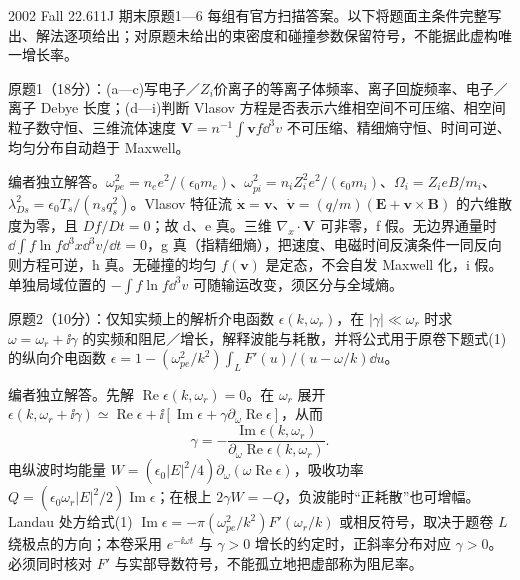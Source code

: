 2002 Fall 22.611J 期末原题1—6 每组有官方扫描答案。以下将题面主条件完整写出、解法逐项给出；对原题未给出的束密度和碰撞参数保留符号，不能据此虚构唯一增长率。
\begin{exercise}\label{ex:hist02-final-1}
原题1（18分）：(a—c)写电子／$Z_i$价离子的等离子体频率、离子回旋频率、电子／离子 Debye 长度；(d—i)判断 Vlasov 方程是否表示六维相空间不可压缩、相空间粒子数守恒、三维流体速度 $\mathbf V=n^{-1}\int\mathbf vf\dd^3v$ 不可压缩、精细熵守恒、时间可逆、均匀分布自动趋于 Maxwell。
\end{exercise}
\begin{solution}
编者独立解答。$\omega_{pe}^2=n_ee^2/(\epsilon_0m_e)$、$\omega_{pi}^2=n_iZ_i^2e^2/(\epsilon_0m_i)$、$\Omega_i=Z_ieB/m_i$、$\lambda_{Ds}^2=\epsilon_0T_s/(n_sq_s^2)$。Vlasov 特征流 $\dot{\mathbf x}=\mathbf v$、$\dot{\mathbf v}=(q/m)(\mathbf E+\mathbf v\times\mathbf B)$ 的六维散度为零，且 $Df/Dt=0$；故 d、e 真。三维 $\nabla_x\cdot\mathbf V$ 可非零，f 假。无边界通量时 $\dd\int f\ln f\dd^3x\dd^3v/\dd t=0$，g 真（指精细熵），把速度、电磁时间反演条件一同反向则方程可逆，h 真。无碰撞的均匀 $f(\mathbf v)$ 是定态，不会自发 Maxwell 化，i 假。单独局域位置的 $-\int f\ln f\dd^3v$ 可随输运改变，须区分与全域熵。
\end{solution}

\begin{exercise}\label{ex:hist02-final-2}
原题2（10分）：仅知实频上的解析介电函数 $\epsilon(k,\omega_r)$，在 $|\gamma|\ll\omega_r$ 时求 $\omega=\omega_r+\ii\gamma$ 的实频和阻尼／增长，解释波能与耗散，并将公式用于原卷下题式(1)的纵向介电函数 $\epsilon=1-(\omega_{pe}^2/k^2)\int_L F'(u)/(u-\omega/k)\dd u$。
\end{exercise}
\begin{solution}
编者独立解答。先解 $\operatorname{Re}\epsilon(k,\omega_r)=0$。在 $\omega_r$ 展开 $\epsilon(k,\omega_r+\ii\gamma)\simeq\operatorname{Re}\epsilon+\ii[\operatorname{Im}\epsilon+\gamma\partial_\omega\operatorname{Re}\epsilon]$，从而
\begin{equation}\gamma=-\frac{\operatorname{Im}\epsilon(k,\omega_r)}{\partial_\omega\operatorname{Re}\epsilon(k,\omega_r)}.
\end{equation}
电纵波时均能量 $W=(\epsilon_0|E|^2/4)\partial_\omega(\omega\operatorname{Re}\epsilon)$，吸收功率 $Q=(\epsilon_0\omega_r|E|^2/2)\operatorname{Im}\epsilon$；在根上 $2\gamma W=-Q$，负波能时“正耗散”也可增幅。Landau 处方给式(1) $\operatorname{Im}\epsilon=-\pi(\omega_{pe}^2/k^2)F'(\omega_r/k)$ 或相反符号，取决于题卷 $L$ 绕极点的方向；本卷采用 $e^{-\ii\omega t}$ 与 $\gamma>0$ 增长的约定时，正斜率分布对应 $\gamma>0$。必须同时核对 $F'$ 与实部导数符号，不能孤立地把虚部称为阻尼率。
\end{solution}

